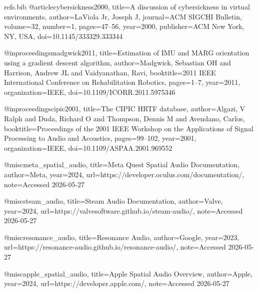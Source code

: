 \begin{filecontents*}{refs.bib}
@article{cybersickness2000,
  title={A discussion of cybersickness in virtual environments},
  author={LaViola Jr, Joseph J},
  journal={ACM SIGCHI Bulletin},
  volume={32},
  number={1},
  pages={47--56},
  year={2000},
  publisher={ACM New York, NY, USA},
  doi={10.1145/333329.333344}
}

@inproceedings{madgwick2011,
  title={Estimation of IMU and MARG orientation using a gradient descent algorithm},
  author={Madgwick, Sebastian OH and Harrison, Andrew JL and Vaidyanathan, Ravi},
  booktitle={2011 IEEE International Conference on Rehabilitation Robotics},
  pages={1--7},
  year={2011},
  organization={IEEE},
  doi={10.1109/ICORR.2011.5975346}
}

@inproceedings{cipic2001,
  title={The CIPIC HRTF database},
  author={Algazi, V Ralph and Duda, Richard O and Thompson, Dennis M and Avendano, Carlos},
  booktitle={Proceedings of the 2001 IEEE Workshop on the Applications of Signal Processing to Audio and Acoustics},
  pages={99--102},
  year={2001},
  organization={IEEE},
  doi={10.1109/ASPAA.2001.969552}
}

@misc{meta_spatial_audio,
    title={Meta Quest Spatial Audio Documentation},
    author={{Meta}},
    year={2024},
    url={https://developer.oculus.com/documentation/},
    note={Accessed 2026-05-27}
}

@misc{steam_audio,
    title={Steam Audio Documentation},
    author={{Valve}},
    year={2024},
    url={https://valvesoftware.github.io/steam-audio/},
    note={Accessed 2026-05-27}
}

@misc{resonance_audio,
    title={Resonance Audio},
    author={{Google}},
    year={2023},
    url={https://resonance-audio.github.io/resonance-audio/},
    note={Accessed 2026-05-27}
}

@misc{apple_spatial_audio,
    title={Apple Spatial Audio Overview},
    author={{Apple}},
    year={2024},
    url={https://developer.apple.com/},
    note={Accessed 2026-05-27}
}
\end{filecontents*}

\documentclass[12pt,a4paper,oneside]{report}

\usepackage[T5]{fontenc}
\usepackage[utf8]{inputenc}
\usepackage{newtxtext,newtxmath}
\usepackage[vietnamese]{babel}
\usepackage{microtype}

